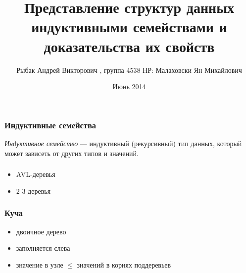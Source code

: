 \documentclass[17pt]{beamer}
\title[Представление структур данных индуктивными семействами и доказательства их свойств]{Представление структур данных индуктивными семействами и доказательства их свойств}
\institute{НИУ ИТМО}
\author[Рыбак А.В.]{Рыбак Андрей Викторович , группа 4538
\newline НР: Малаховски Ян Михайлович}
\date{
Июнь 2014
}
\begin{document}
\maketitle

\begin{frame}
    \frametitle{Индуктивные семейства}
    \emph{Индуктивное семейство} — индуктивный (рекурсивный) тип данных,
        который может зависеть от других типов и значений.
\end{frame}

\begin{frame}
    \frametitle{}
    \begin{itemize}
        \item AVL-деревья
        \item 2-3-деревья
    \end{itemize}
\end{frame}

\AgdaHide{

}

\begin{frame}
    \frametitle{Куча}
    \begin{itemize}
        \item двоичное дерево
        \item заполняется слева
        \item значение в узле $ \leq $ значений в корнях поддеревьев
    \end{itemize}
\end{frame}
\fontsize{14pt}{14pt}\selectfont

\end{document}
